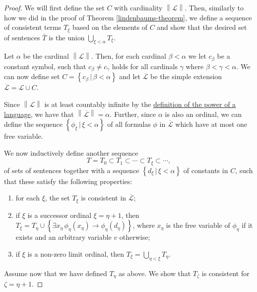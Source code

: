 \documentclass[../../main.tex]{subfiles}
\begin{document}
\begin{proof}
    We will first define the set $C$ with cardinality $\left\lVert \mathcal{L} \right\rVert$.
    Then, similarly to how we did in the proof of Theorem \ref{lindenbaums-theorem}, 
    we define a sequence of consistent terms $T_\xi$ based on the elements of $C$ and show that the desired set of sentences $\bar{T}$ is the union $\bigcup_{\xi < \alpha} T_\xi$.

    Let $\alpha$ be the cardinal $\left\lVert \mathcal{L}\right\rVert$.
    Then, for each cardinal $\beta < \alpha$ we let $c_\beta$ be a constant symbol, 
    such that $c_\beta \neq c_\gamma$ holds for all cardinals $\gamma$ where $\beta < \gamma < \alpha$.
    We can now define set $C = \left\{c_\beta \,\vert\, \beta < \alpha\right\}$ 
    and let $\overline{\mathcal{L}}$ be the simple extension $\overline{\mathcal{L}} = \mathcal{L} \cup C$.

    Since $\left\lVert \mathcal{L}\right\rVert$ is at least countably infinite by the \hyperref[language-def]{definition of the power of a language},
    we have that $\left\lVert \overline{\mathcal{L}}\right\rVert = \alpha$.
    Further, since $\alpha$ is also an ordinal, 
    we can define the sequence $\left\{\phi_\xi \, \vert \, \xi < \alpha\right\}$ of all formulas $\phi$ in $\overline{\mathcal{L}}$ which have at most one free variable.

    We now inductively define another sequence
    $$T = T_0 \subset T_1 \subset \cdots \subset T_\xi \subset \cdots,$$
    of sets of sentences together with a sequence $\left\{d_\xi \, \vert \, \xi < \alpha\right\}$ of constants in $C$,
    such that these satisfy the following properties:
    \begin{enumerate}[label=(\roman*)]
        \item for each $\xi$, the set $T_\xi$ is consistent in $\overline{\mathcal{L}}$;
        \item if $\xi$ is a successor ordinal $\xi = \eta + 1$, 
        then $T_\xi = T_\eta \cup \left\{\exists x_\eta \, \phi_\eta(x_\eta) \rightarrow \phi_\eta(d_\eta)\right\}$,
        where $x_\eta$ is the free variable of $\phi_\eta$ if it exists and an arbitrary variable $v$ otherwise;
        \item if $\xi$ is a non-zero limit ordinal,
        then $T_\xi = \bigcup_{\eta < \xi} T_\eta$.
    \end{enumerate}

    Assume now that we have defined $T_\eta$ as above.
    We show that $T_\zeta$ is consistent for $\zeta = \eta + 1$.


\end{proof}
\end{document}
